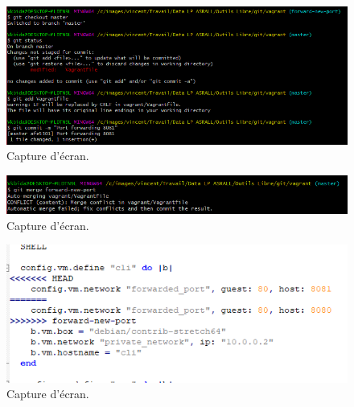 \documentclass{article}
\begin{document}
\begin{figure}[h]
\centering
\includegraphics[width=\textwidth]{images/q3-3-2.png}
\caption{\label{fig:frog}Capture d'écran.}
\end{figure}

\begin{figure}[h]
\centering
\includegraphics[width=\textwidth]{images/q3-3-3.png}
\caption{\label{fig:frog}Capture d'écran.}
\end{figure}

\begin{figure}[h]
\centering
\includegraphics[width=\textwidth]{images/q3-3-4.png}
\caption{\label{fig:frog}Capture d'écran.}
\end{figure}



\end{document}
